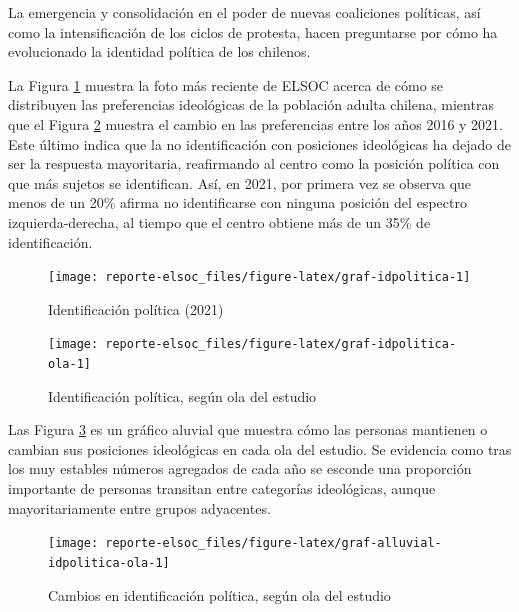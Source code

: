\documentclass[
  12pt,
]{book}
\begin{document}
La emergencia y consolidación en el poder de nuevas coaliciones políticas, así como la intensificación de los ciclos de protesta, hacen preguntarse por cómo ha evolucionado la identidad política de los chilenos.

La Figura \ref{fig:graf-idpolitica} muestra la foto más reciente de ELSOC acerca de cómo se distribuyen las preferencias ideológicas de la población adulta chilena, mientras que el Figura \ref{fig:graf-idpolitica-ola} muestra el cambio en las preferencias entre los años 2016 y 2021. Este último indica que la no identificación con posiciones ideológicas ha dejado de ser la respuesta mayoritaria, reafirmando al centro como la posición política con que más sujetos se identifican. Así, en 2021, por primera vez se observa que menos de un 20\% afirma no identificarse con ninguna posición del espectro izquierda-derecha, al tiempo que el centro obtiene más de un 35\% de identificación.

\begin{figure}

{\centering \texttt{[image: reporte-elsoc\_files/figure-latex/graf-idpolitica-1]} 

}

\caption{Identificación política (2021)}\label{fig:graf-idpolitica}
\end{figure}

\begin{figure}

{\centering \texttt{[image: reporte-elsoc\_files/figure-latex/graf-idpolitica-ola-1]} 

}

\caption{Identificación política, según ola del estudio}\label{fig:graf-idpolitica-ola}
\end{figure}

Las Figura \ref{fig:graf-alluvial-idpolitica-ola} es un gráfico aluvial que muestra cómo las personas mantienen o cambian sus posiciones ideológicas en cada ola del estudio. Se evidencia como tras los muy estables números agregados de cada año se esconde una proporción importante de personas transitan entre categorías ideológicas, aunque mayoritariamente entre grupos adyacentes.

\begin{figure}

{\centering \texttt{[image: reporte-elsoc\_files/figure-latex/graf-alluvial-idpolitica-ola-1]} 

}

\caption{Cambios en identificación política, según ola del estudio}\label{fig:graf-alluvial-idpolitica-ola}
\end{figure}
\end{document}
